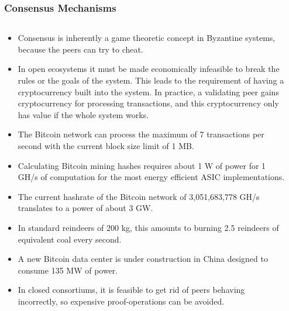 \documentclass[8pt]{beamer}
\begin{document}
\begin{frame}
\frametitle{Consensus Mechanisms}

\begin{columns}
\begin{column}{0.9\textwidth}

\begin{itemize}
 \item Consensus is inherently a game theoretic concept in Byzantine systems, because the peers can try to cheat.
 \item In open ecosystems it must be made economically infeasible to break the rules or the goals of the system. This leads to the requirement of having a cryptocurrency built into the system.
       In practice, a validating peer gains cryptocurrency for processing transactions, and this cryptocurrency only has value if the whole system works.
 \item The Bitcoin network can process the maximum of 7 transactions per second with the current block size limit of 1 MB.
 \item Calculating Bitcoin mining hashes requires about 1 W of power for 1 GH/s of computation for the most energy efficient ASIC implementations.
 \item The current hashrate of the Bitcoin network of 3,051,683,778 GH/s translates to a power of about 3 GW.
 \item In standard reindeers of 200 kg, this amounts to burning 2.5 reindeers of equivalent coal every second.
 \item A new Bitcoin data center is under construction in China designed to consume 135 MW of power.
 \item In closed consortiums, it is feasible to get rid of peers behaving incorrectly, so expensive proof-operations can be avoided.
\end{itemize}
\end{column}
\begin{column}{0.1\textwidth}

\end{column}
\end{columns}
\end{frame}
\end{document}

